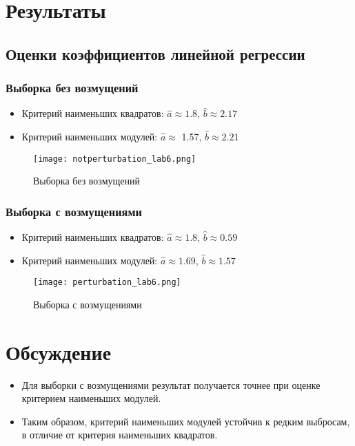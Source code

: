 \documentclass[12pt,a4paper]{scrartcl}
\begin{document}
\section{Результаты}
\subsection{Оценки коэффициентов линейной регрессии}
	\subsubsection{Выборка без возмущений}
	\begin{itemize}
	    \item{Критерий наименьших квадратов:}
	    $\hat{a}\approx 1.8$, $\hat{b}\approx 2.17 $
	    \item{Критерий наименьших модулей:}
	     $\hat{a}\approx$ 1.57, $\hat{b}\approx 2.21$
	\end{itemize}
	\begin{figure}[H]
	    \centering
	    \texttt{[image: notperturbation\_lab6.png]}
	    \caption{Выборка без возмущений}
	    \label{w/o_dist}
	\end{figure}
	
	\subsubsection{Выборка с возмущениями}
	\begin{itemize}
	    \item{Критерий наименьших квадратов:}
	    $\hat{a}\approx 1.8$, $\hat{b}\approx 0.59$
	    \item{Критерий наименьших модулей:}
	     $\hat{a}\approx 1.69$, $\hat{b}\approx 1.57$
	\end{itemize}
	\begin{figure}[H]
	    \centering
	    \texttt{[image: perturbation\_lab6.png]}
	    \caption{Выборка с возмущениями}
	    \label{w/o_dist}
	\end{figure}

\section{Обсуждение}
\begin{itemize}
 наименьших квадратов точнее оценивает коэффициенты линейной регрессии на выборке без возмущений. 
\item
Для выборки с возмущениями результат получается точнее при оценке критерием наименьших модулей.
\item
Таким образом, критерий наименьших модулей устойчив к редким выбросам, в отличие от критерия наименьших квадратов.
\end{itemize}
\end{document}
